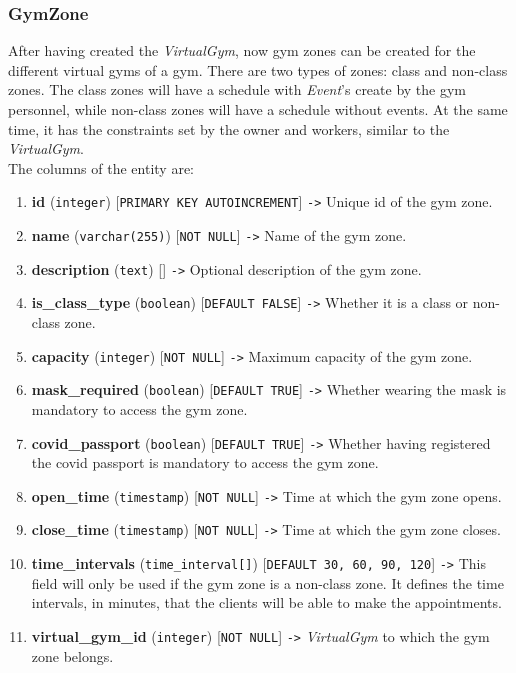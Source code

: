 \documentclass[a4paper, 12pt, oneside]{book}
\begin{document}
\subsubsection{GymZone}
After having created the \emph{VirtualGym}, now gym zones can be created for the different virtual gyms of a gym. There are two types of zones: class and non-class zones. The class zones will have a schedule with \emph{Event}'s create by the gym personnel, while non-class zones will have a schedule without events. At the same time, it has the constraints set by the owner and workers, similar to the \emph{VirtualGym}.
\\[8pt]
The columns of the entity are:
\begin{enumerate}[label = -]
	\item \textbf{id} (\texttt{integer}) [\texttt{PRIMARY KEY AUTOINCREMENT}] \texttt{->} Unique id of the gym zone.
	\item \textbf{name} (\texttt{varchar(255)}) [\texttt{NOT NULL}] \texttt{->} Name of the gym zone.
	\item \textbf{description} (\texttt{text}) [] \texttt{->} Optional description of the gym zone.
	\item \textbf{is\_class\_type} (\texttt{boolean}) [\texttt{DEFAULT FALSE}] \texttt{->} Whether it is a class or non-class zone.
	\item \textbf{capacity} (\texttt{integer}) [\texttt{NOT NULL}] \texttt{->} Maximum capacity of the gym zone.
	\item \textbf{mask\_required} (\texttt{boolean}) [\texttt{DEFAULT TRUE}] \texttt{->} Whether wearing the mask is mandatory to access the gym zone.
	\item \textbf{covid\_passport} (\texttt{boolean}) [\texttt{DEFAULT TRUE}] \texttt{->} Whether having registered the covid passport is mandatory to access the gym zone.
	\item \textbf{open\_time} (\texttt{timestamp}) [\texttt{NOT NULL}] \texttt{->} Time at which the gym zone opens.
	\item \textbf{close\_time} (\texttt{timestamp}) [\texttt{NOT NULL}] \texttt{->} Time at which the gym zone closes.
	\item \textbf{time\_intervals} (\texttt{time\_interval[]}) [\texttt{DEFAULT {30, 60, 90, 120}}] \texttt{->} This field will only be used if the gym zone is a non-class zone. It defines the time intervals, in minutes, that the clients will be able to make the appointments.
	\item \textbf{virtual\_gym\_id} (\texttt{integer}) [\texttt{NOT NULL}] \texttt{->} \emph{VirtualGym} to which the gym zone belongs.
\end{enumerate}
\end{document}
